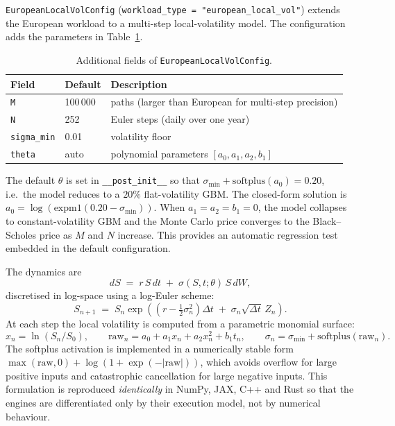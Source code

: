 \texttt{EuropeanLocalVolConfig} (\texttt{workload\_type = "european\_local\_vol"})
extends the European workload to a multi-step local-volatility model. The
configuration adds the parameters in Table~\ref{tab:localvol-fields}.

\begin{table}[h]
\centering
\caption{Additional fields of \texttt{EuropeanLocalVolConfig}.}
\label{tab:localvol-fields}
\begin{tabular}{lll}
\hline
Field & Default & Description \\
\hline
\texttt{M} & 100\,000 & paths (larger than European for multi-step precision) \\
\texttt{N} & 252 & Euler steps (daily over one year) \\
\texttt{sigma\_min} & 0.01 & volatility floor \\
\texttt{theta} & auto & polynomial parameters $[a_0, a_1, a_2, b_1]$ \\
\hline
\end{tabular}
\end{table}

The default $\theta$ is set in \texttt{\_\_post\_init\_\_} so that
$\sigma_{\min} + \mathrm{softplus}(a_0) = 0.20$, i.e.\ the model reduces to a
$20\%$ flat-volatility GBM. The closed-form solution is
$a_0 = \log(\mathrm{expm1}(0.20 - \sigma_{\min}))$. When
$a_1 = a_2 = b_1 = 0$, the model collapses to constant-volatility GBM and the
Monte Carlo price converges to the Black--Scholes price as $M$ and $N$ increase.
This provides an automatic regression test embedded in the default configuration.

The dynamics are
\[
dS \;=\; r\,S\,dt \;+\; \sigma(S, t;\theta)\,S\,dW,
\]
discretised in log-space using a log-Euler scheme:
\[
S_{n+1} \;=\; S_n \exp\!\left(\left(r - \tfrac{1}{2}\sigma_n^2\right)\Delta t \;+\; \sigma_n\sqrt{\Delta t}\,Z_n\right).
\]
At each step the local volatility is computed from a parametric monomial surface:
\[
x_n = \ln(S_n / S_0), \qquad
\mathrm{raw}_n = a_0 + a_1 x_n + a_2 x_n^2 + b_1 t_n, \qquad
\sigma_n = \sigma_{\min} + \mathrm{softplus}(\mathrm{raw}_n).
\]
The softplus activation is implemented in a numerically stable form
$\max(\mathrm{raw},0) + \log(1 + \exp(-|\mathrm{raw}|))$, which avoids overflow
for large positive inputs and catastrophic cancellation for large negative
inputs. This formulation is reproduced \emph{identically} in NumPy, JAX, C++
and Rust so that the engines are differentiated only by their execution model,
not by numerical behaviour.

